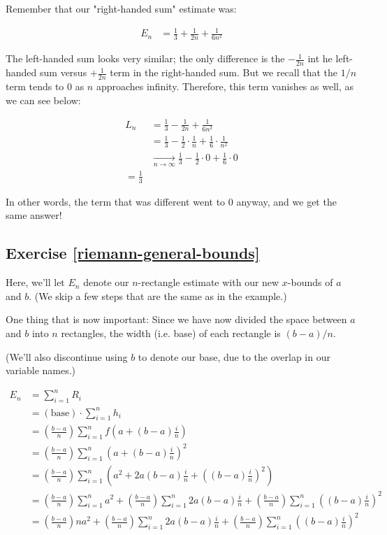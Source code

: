 \documentclass{book}
\begin{document}
Remember that our "right-handed sum" estimate was:

\begin{align*}
E_n &= \frac{1}{3} + \frac{1}{2n} + \frac{1}{6n^2}
\end{align*}

The left-handed sum looks very similar; the only difference is the $- \frac{1}{2n}$ int he left-handed sum versus $+ \frac{1}{2n}$ term in the right-handed sum. But we recall that the $1/n$ term tends to 0 as $n$ approaches infinity. Therefore, this term vanishes as well, as we can see below: 

\begin{align*}
L_n &= \frac{1}{3} - \frac{1}{2n} + \frac{1}{6n^2} \\
&= \frac{1}{3} - \frac{1}{2} \cdot \frac{1}{n} + \frac{1}{6} \cdot \frac{1}{n^2} \\
&\xrightarrow[n \to \infty]{} \frac{1}{3} - \frac{1}{2} \cdot 0 + \frac{1}{6} \cdot 0 \\
= \frac{1}{3}
\end{align*}

In other words, the term that was different went to 0 anyway, and we get the same answer! 


\subsection{Exercise \ref{riemann-general-bounds}}

Here, we'll let $E_n$ denote our $n$-rectangle estimate with our new $x$-bounds of $a$ and $b$. (We skip a few steps that are the same as in the example.)

One thing that is now important: Since we have now divided the space between $a$ and $b$ into $n$ rectangles, the width (i.e. base) of each rectangle is $(b-a)/n$. 

(We'll also discontinue using $b$ to denote our base, due to the overlap in our variable names.)

\begin{align*}
E_n &= \sum_{i=1}^n R_i \\
&= (\text{base}) \cdot \sum_{i=1}^n h_i \\
&= \left(\frac{b-a}{n}\right) \sum_{i=1}^n f\left(a + (b-a)\frac{i}{n}\right) \\
&= \left(\frac{b-a}{n}\right) \sum_{i=1}^n \left(a + (b-a)\frac{i}{n}\right)^2 \\
&= \left(\frac{b-a}{n}\right) \sum_{i=1}^n \left(a^2 + 2a(b-a)\frac{i}{n} + \left((b-a)\frac{i}{n}\right)^2\right) \\
&= \left(\frac{b-a}{n}\right) \sum_{i=1}^n a^2 + \left(\frac{b-a}{n}\right) \sum_{i=1}^n 2a(b-a)\frac{i}{n} + \left(\frac{b-a}{n}\right) \sum_{i=1}^n \left((b-a)\frac{i}{n}\right)^2 \\
&= \left(\frac{b-a}{n}\right) n a^2 + \left(\frac{b-a}{n}\right) \sum_{i=1}^n 2a(b-a)\frac{i}{n} + \left(\frac{b-a}{n}\right) \sum_{i=1}^n \left((b-a)\frac{i}{n}\right)^2 \\
\end{align*}
\end{document}
